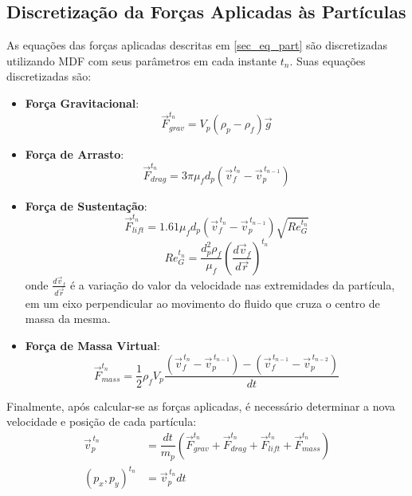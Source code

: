 \subsection{\textbf{Discretização da Forças Aplicadas às Partículas}}
As equações das forças aplicadas descritas em \ref{sec_eq_part} são discretizadas utilizando MDF com seus parâmetros em cada instante $t_n$.
Suas equações discretizadas são:
\begin{itemize}
    \item \textbf{Força Gravitacional}:
        \begin{equation}
            \vec{F}_{grav}^{t_n} = V_p (\rho_p - \rho_f) \vec{g}
            \label{grav_discret}
        \end{equation}

    \item \textbf{Força de Arrasto}:
        \begin{equation}
            \vec{F}_{drag}^{t_n} = 3 \pi \mu_f d_p \left(\vec{v}_{f}^{\,t_n} - \vec{v}_{p}^{\,t_{n-1}} \right)
            \label{drag_discret}
        \end{equation}

    \item \textbf{Força de Sustentação}:
        \begin{equation}
            \vec{F}_{lift}^{t_n} = 1.61 \mu_f d_p \left(\vec{v}_{f}^{\,t_n} - \vec{v}_{p}^{\,t_{n-1}} \right) \sqrt{{Re}_G^{t_n}}
            \label{lift_discret}
        \end{equation}
        \begin{equation}
            Re_G^{t_n} = \dfrac{d_p^2 \rho_f}{\mu_f} \left( \dfrac{d\vec{v}_f}{d\vec{r}} \right)^{t_n}
            \label{reg_discret}
        \end{equation}
        onde $\tfrac{d\vec{v}_f}{d\vec{r}}$ é a variação do valor da velocidade nas extremidades da partícula, em um eixo perpendicular ao movimento do fluido que cruza o centro de massa da mesma.

    \item \textbf{Força de Massa Virtual}:
        \begin{equation}
            \vec{F}_{mass}^{t_n} = \dfrac{1}{2} \rho_f V_p \dfrac{\left(\vec{v}_{f}^{\,t_n} - \vec{v}_{p}^{\,t_{n-1}}\right) -
            \left(\vec{v}_{f}^{\,t_{n-1}} - \vec{v}_{p}^{\,t_{n-2}} \right)}{dt}
            \label{mass_discret}
        \end{equation}
\end{itemize}

Finalmente, após calcular-se as forças aplicadas, é necessário determinar a nova velocidade e posição de cada partícula:
\begin{align}
    \vec{v}_p^{\,t_n} &= \dfrac{dt}{m_p} \left(\vec{F}_{grav}^{t_n} + \vec{F}_{drag}^{t_n} + \vec{F}_{lift}^{t_n} +\vec{F}_{mass}^{t_n} \right)
    \label{vel_discret} \\
    (p_x, p_y)^{t_n} &= \vec{v}_p^{\,t_n} dt
    \label{pos_discret}
\end{align}